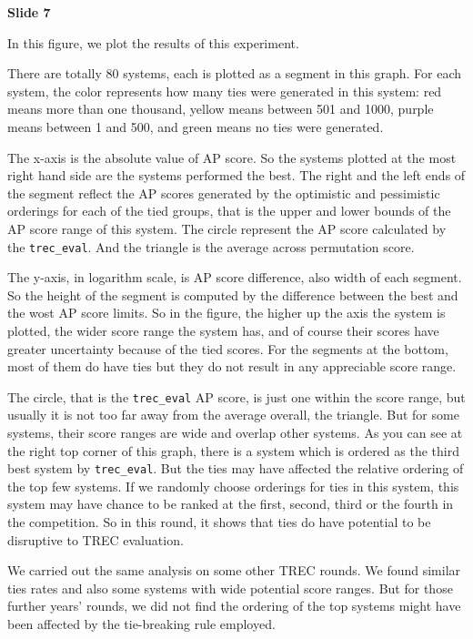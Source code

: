 \documentclass{article}
\begin{document}
\textbf{Slide 7}

In this figure, we plot the results of this experiment. 

There are totally 80 systems, each is plotted as a segment in this graph. For each system, the color represents how many ties were generated in this system: red means more than one thousand, yellow means between 501 and 1000, purple means between 1 and 500, and green means no ties were generated. 

The x-axis is the absolute value of AP score. So the systems plotted at the most right hand side are the systems performed the best. The right and the left ends of the segment reflect the AP scores generated by the optimistic and pessimistic orderings for each of the tied groups, that is the upper and lower bounds of the AP score range of this system. The circle represent the AP score calculated by the \texttt{trec\_eval}. And the triangle is the average across permutation score.

The y-axis, in logarithm scale, is AP score difference, also width of each segment. So the height of the segment is computed by the difference between the best and the wost AP score limits. So in the figure, the higher up the axis the system is plotted, the wider score range the system has, and of course their scores have greater uncertainty because of the tied scores. For the segments at the bottom, most of them do have ties but they do not result in any appreciable score range.

The circle, that is the \texttt{trec\_eval} AP score, is just one within the score range, but usually it is not too far away from the average overall, the triangle. But for some systems, their score ranges are wide and overlap other systems. As you can see at the right top corner of this graph, there is a system which is ordered as the third best system by \texttt{trec\_eval}. But the ties may have affected the relative ordering of the top few systems. If we randomly choose orderings for ties in this system, this system may have chance to be ranked at the first, second, third or the fourth in the competition. So in this round, it shows that ties do have potential to be disruptive to TREC evaluation.

We carried out the same analysis on some other TREC rounds. We found similar ties rates and also some systems with wide potential score ranges. But for those further years' rounds, we did not find the ordering of the top systems might have been affected by the tie-breaking rule employed.\\[1em]
\end{document}
